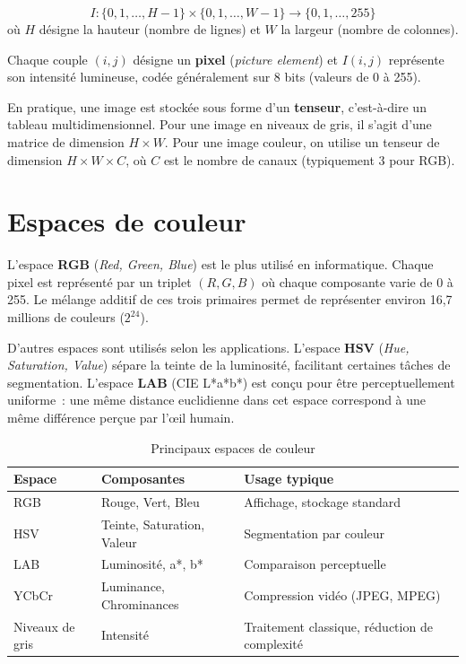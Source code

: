 \documentclass[a4paper,11pt,twoside]{book}
\begin{document}
\begin{defbox}
\[
I : \{0, 1, \ldots, H{-}1\} \times \{0, 1, \ldots, W{-}1\} \longrightarrow \{0, 1, \ldots, 255\}
\]
où $H$ désigne la hauteur (nombre de lignes) et $W$ la largeur (nombre de colonnes).
\end{defbox}

Chaque couple $(i, j)$ désigne un \textbf{pixel} (\textit{picture element}) et $I(i, j)$ représente son intensité lumineuse, codée généralement sur 8 bits (valeurs de 0 à 255).

En pratique, une image est stockée sous forme d'un \textbf{tenseur}, c'est-à-dire un tableau multidimensionnel. Pour une image en niveaux de gris, il s'agit d'une matrice de dimension $H \times W$. Pour une image couleur, on utilise un tenseur de dimension $H \times W \times C$, où $C$ est le nombre de canaux (typiquement 3 pour RGB).

\section{Espaces de couleur}

L'espace \textbf{RGB} (\textit{Red, Green, Blue}) est le plus utilisé en informatique. Chaque pixel est représenté par un triplet $(R, G, B)$ où chaque composante varie de 0 à 255. Le mélange additif de ces trois primaires permet de représenter environ 16,7 millions de couleurs ($2^{24}$).

D'autres espaces sont utilisés selon les applications. L'espace \textbf{HSV} (\textit{Hue, Saturation, Value}) sépare la teinte de la luminosité, facilitant certaines tâches de segmentation. L'espace \textbf{LAB} (CIE L*a*b*) est conçu pour être perceptuellement uniforme~: une même distance euclidienne dans cet espace correspond à une même différence perçue par l'œil humain.

\begin{table}[H]
\centering
\caption{Principaux espaces de couleur}
\begin{tabularx}{\textwidth}{l l X}
\toprule
\textbf{Espace} & \textbf{Composantes} & \textbf{Usage typique} \\
\midrule
RGB & Rouge, Vert, Bleu & Affichage, stockage standard \\
HSV & Teinte, Saturation, Valeur & Segmentation par couleur \\
LAB & Luminosité, a*, b* & Comparaison perceptuelle \\
YCbCr & Luminance, Chrominances & Compression vidéo (JPEG, MPEG) \\
Niveaux de gris & Intensité & Traitement classique, réduction de complexité \\
\bottomrule
\end{tabularx}
\end{table}
\end{document}
